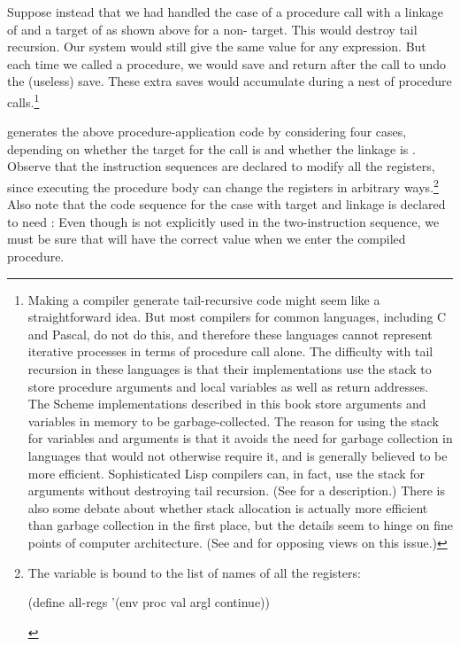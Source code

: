Suppose instead that we had handled the case of a procedure call with a linkage
of  and a target of  as shown above for a non-
target.  This would destroy tail recursion.  Our system would still give the
same value for any expression.  But each time we called a procedure, we would
save  and return after the call to undo the (useless) save.
These extra saves would accumulate during a nest of procedure
calls.\footnote{Making a compiler generate tail-recursive code might seem like
a straightforward idea.  But most compilers for common languages, including C
and Pascal, do not do this, and therefore these languages cannot represent
iterative processes in terms of procedure call alone.  The difficulty with tail
recursion in these languages is that their implementations use the stack to
store procedure arguments and local variables as well as return addresses.  The
Scheme implementations described in this book store arguments and variables in
memory to be garbage-collected.  The reason for using the stack for variables
and arguments is that it avoids the need for garbage collection in languages
that would not otherwise require it, and is generally believed to be more
efficient.  Sophisticated Lisp compilers can, in fact, use the stack for
arguments without destroying tail recursion.  (See  for a
description.)  There is also some debate about whether stack allocation is
actually more efficient than garbage collection in the first place, but the
details seem to hinge on fine points of computer architecture.  (See 
and  for opposing views on this issue.)}

 generates the above procedure-application code by
considering four cases, depending on whether the target for the call is
 and whether the linkage is .  Observe that the
instruction sequences are declared to modify all the registers, since executing
the procedure body can change the registers in arbitrary ways.\footnote{The
variable  is bound to the list of names of all the registers:

\begin{smallscheme}
(define all-regs '(env proc val argl continue))
\end{smallscheme}
} Also note that the code sequence for the case with target  and
linkage  is declared to need : Even though
 is not explicitly used in the two-instruction sequence, we must
be sure that  will have the correct value when we enter the
compiled procedure.

